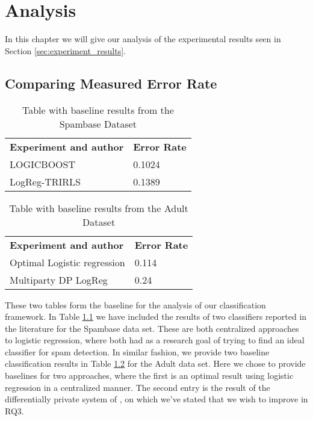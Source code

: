 
\chapter{Analysis}
\label{ch:analysis}
In this chapter we will give our analysis of the experimental results seen in Section \ref{sec:experiment_results}.

\section{Comparing Measured Error Rate}
\begin{table}[h]
	\begin{tabularx}{\textwidth}{|X|l|}
		\textbf{Experiment and author}                                             & \textbf{Error Rate}      \\
		LOGICBOOST\citep{sharma2013adaptive}                                       & 0.1024 \\
		LogReg-TRIRLS\citep{kumar2012comparative}                                  & 0.1389 \\
	\end{tabularx}
	\caption{Table with baseline results from the Spambase Dataset}
	\label{tab:baseline_class_results_spambase}
\end{table}

\begin{table}[h]
\begin{tabularx}{\textwidth}{|X|l|}
	\textbf{Experiment and author}                                                 & \textbf{Error Rate}      \\
	Optimal Logistic regression \citep{caruana2006empirical}   				       & 0.114 \\
	Multiparty DP LogReg \citep{pathak2010diffprivhomo}                            & 0.24 \\	
\end{tabularx}
\caption{Table with baseline results from the Adult Dataset}
\label{tab:baseline_class_results_adult}
\end{table}

	

These two tables form the baseline for the analysis of our classification framework. In Table \ref{tab:baseline_class_results_spambase} we have included the results of two classifiers reported in the literature \citep{sharma2013adaptive,kumar2012comparative} for the Spambase data set. These are both centralized approaches to logistic regression, where both had as a research goal of trying to find an ideal classifier for spam detection. In similar fashion, we provide two baseline classification results in Table \ref{tab:baseline_class_results_adult} for the Adult data set. Here we chose to provide baselines for two approaches, where the first \citep{caruana2006empirical} is an optimal result using logistic regression in a centralized manner. The second entry is the result of the differentially private system of \cite{pathak2010diffprivhomo}, on which we've stated that we wish to improve in RQ3.

